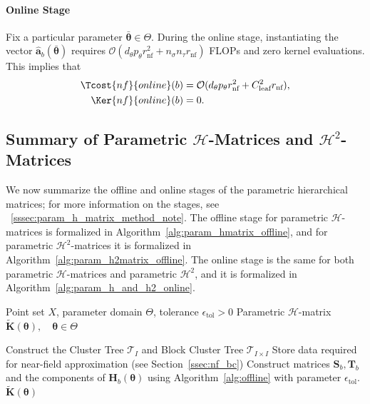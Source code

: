 \documentclass[final,3p,times]{elsarticle}
\newcommand{\mc}[1]{\mathcal{#1}}
\renewcommand{\vec}[1]{\boldsymbol{#1}}
\newcommand{\vech}[1]{\widehat{\boldsymbol{#1}}}
\newcommand{\mat}[1]{\boldsymbol{#1}}
\newcommand{\mathat}[1]{\widetilde{\boldsymbol{#1}}}
\begin{document}
\paragraph{Online Stage}
Fix a particular parameter $\bar{\vec{\theta}} \in \Theta$. During the online stage, instantiating the vector $\vech{a}_{b}(\bar{\vec{\theta}})$ requires $\mc{O}(d_{\theta}p_{\theta}r_{\text{nf}}^2 + n_{\sigma}n_{\tau}r_{\text{nf}})$ FLOPs and zero kernel evaluations. This implies that  
\begin{align}
         \Tcost{nf}{online}(b) &= \mc{O}(d_{\theta}p_{\theta}r_{\text{nf}}^2 + C_{\text{leaf}}^{2}r_{\text{nf}} ),\label{ceqn:nf_online} \\ 
     \Ker{nf}{online}(b) &= 0. 
\end{align}




\subsection{Summary of Parametric \texorpdfstring{$\mc{H}$}{H}-Matrices and  \texorpdfstring{$\mc{H}^{2}$}{H2}-Matrices}\label{ssec:summary_param_h_mat}
We now summarize the offline and online stages of the parametric hierarchical matrices; for more information on the stages, see ~\ref{sssec:param_h_matrix_method_note}. The offline stage for parametric $\mc{H}$-matrices is formalized in Algorithm~\ref{alg:param_hmatrix_offline}, and for parametric $\mc{H}^{2}$-matrices it is formalized in Algorithm~\ref{alg:param_h2matrix_offline}. The online stage is the same for both parametric $\mc{H}$-matrices and parametric $\mc{H}^{2}$, and it is formalized in Algorithm~\ref{alg:param_h_and_h2_online}.



\begin{algorithm}[!ht]
\caption{Offline Stage: Parametric $\mc{H}$-matrix}\label{alg:param_hmatrix_offline}
\begin{algorithmic}[1]
\Require Point set $X$, parameter domain $\Theta$, tolerance $\epsilon_{\mathrm{tol}} > 0$
\Ensure Parametric  $\mc{H}$-matrix $\mathat{K}(\vec{\theta}), \quad \vec{\theta} \in \Theta$

\State Construct the Cluster Tree $\mc{T}_I$ and Block Cluster Tree $\mc{T}_{I \times I}$
\For{each block cluster $b = \sigma \times \tau \in \mc{T}_{I \times I}$}
        \State Store data required for near-field approximation (see Section~\ref{ssec:nf_bc})
    \Else
    \State Construct matrices $\mat{S}_{b}, \mat{T}_{b}$
    and the components of $\mat{H}_{b}(\vec{\theta})$ using Algorithm~\ref{alg:offline} with parameter $\epsilon_{\text{tol}}$.
    \EndIf
\EndFor
\State 
\Return $\mathat{K}(\vec{\theta})$
\end{algorithmic}
\end{algorithm}
\end{document}
